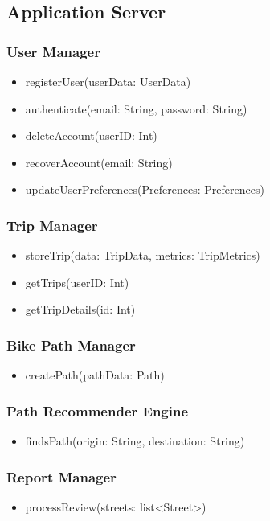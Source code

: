 \documentclass{Configuration_Files/PoliMi3i_thesis}
\begin{document}
\subsection{Application Server}
\subsubsection{User Manager}
\begin{itemize}
    \item registerUser(userData: UserData)
    \item authenticate(email: String, password: String)
    \item deleteAccount(userID: Int)
    \item recoverAccount(email: String)
    \item updateUserPreferences(Preferences: Preferences)
\end{itemize}

\subsubsection{Trip Manager}
\begin{itemize}
    \item storeTrip(data: TripData, metrics: TripMetrics)
    \item getTrips(userID: Int)
    \item getTripDetails(id: Int)
\end{itemize}

\subsubsection{Bike Path Manager}
\begin{itemize}
    \item createPath(pathData: Path)
\end{itemize}

\subsubsection{Path Recommender Engine}
\begin{itemize}
    \item findsPath(origin: String, destination: String)
\end{itemize}

\subsubsection{Report Manager}
\begin{itemize}
    \item processReview(streets: list<Street>)
\end{itemize}
\end{document}
